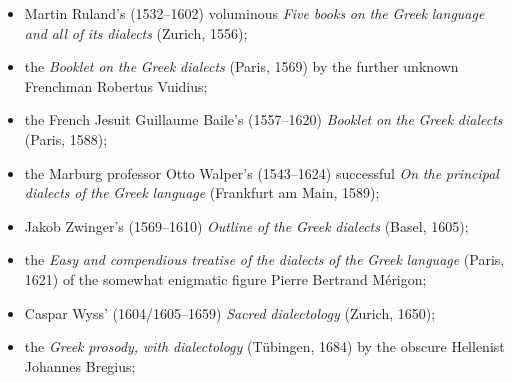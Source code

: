 \begin{itemize}
\item \begin{styleListParagraph}
Martin Ruland’s (1532–1602) voluminous \textit{Five} \textit{books} \textit{on} \textit{the} \textit{Greek} \textit{language} \textit{and} \textit{all} \textit{of} \textit{its} \textit{dialects} (Zurich, 1556);
\end{styleListParagraph}
\item \begin{styleListParagraph}
the \textit{Booklet} \textit{on} \textit{the} \textit{Greek} \textit{dialects} (Paris, 1569) by the further unknown Frenchman Robertus Vuidius;
\end{styleListParagraph}
\item \begin{styleListParagraph}
the French Jesuit Guillaume Baile’s (1557–1620) \textit{Booklet} \textit{on} \textit{the} \textit{Greek} \textit{dialects} (Paris, 1588);
\end{styleListParagraph}
\item \begin{styleListParagraph}
the Marburg professor Otto Walper’s (1543–1624) successful \textit{On} \textit{the} \textit{principal} \textit{dialects} \textit{of} \textit{the} \textit{Greek} \textit{language} (Frankfurt am Main, 1589);
\end{styleListParagraph}
\item \begin{styleListParagraph}
Jakob Zwinger’s (1569–1610) \textit{Outline} \textit{of} \textit{the} \textit{Greek} \textit{dialects} (Basel, 1605);
\end{styleListParagraph}
\item \begin{styleListParagraph}
the \textit{Easy} \textit{and} \textit{compendious} \textit{treatise} \textit{of} \textit{the} \textit{dialects} \textit{of} \textit{the} \textit{Greek} \textit{language} (Paris, 1621) of the somewhat enigmatic figure Pierre Bertrand Mérigon;
\end{styleListParagraph}
\item \begin{styleListParagraph}
Caspar Wyss’ (1604/1605–1659) \textit{Sacred} \textit{dialectology} (Zurich, 1650);
\end{styleListParagraph}
\item \begin{styleListParagraph}
the \textit{Greek} \textit{prosody,} \textit{with} \textit{dialectology} (Tübingen, 1684) by the obscure Hellenist Johannes Bregius;

\end{styleListParagraph}
\end{itemize}
